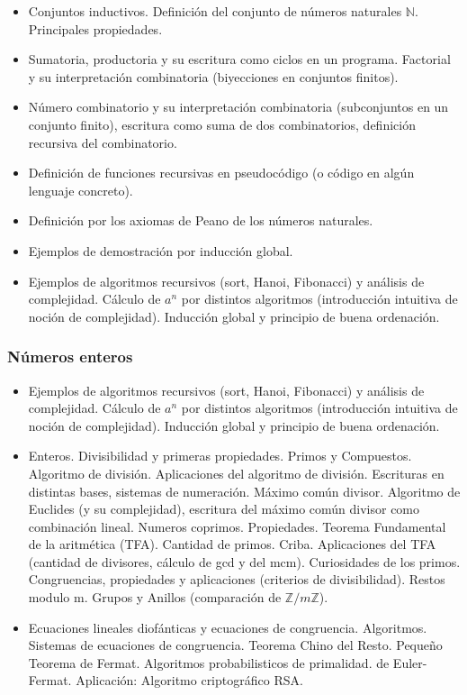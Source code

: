 \documentclass[a4paper,10pt,BCOR10mm,oneside,headsepline]{scrbook}
\begin{document}
\begin{itemize}
\item Conjuntos inductivos. Definición del conjunto de números naturales $\mathbb{N}$. Principales propiedades. 
\item Sumatoria, productoria y su escritura como ciclos en un programa. Factorial y su interpretación combinatoria (biyecciones en conjuntos finitos). 
\item Número combinatorio y su interpretación combinatoria (subconjuntos en un conjunto finito), escritura como suma de dos combinatorios, definición recursiva del combinatorio. 
\item  Definición de funciones recursivas en pseudocódigo (o código en algún lenguaje concreto). 
\item Definición por los axiomas de Peano de los números naturales. 
\item Ejemplos de demostración por inducción global. 
\item  Ejemplos de algoritmos recursivos (sort, Hanoi, Fibonacci) y análisis de complejidad. Cálculo de $a^n$ por distintos algoritmos (introducción intuitiva de noción de complejidad). Inducción global y principio de buena ordenación.
 \end{itemize}


\subsubsection{Números enteros}

 \begin{itemize}
 \item  Ejemplos de algoritmos recursivos (sort, Hanoi, Fibonacci) y análisis de complejidad. Cálculo de $a^n$ por distintos algoritmos (introducción intuitiva de noción de complejidad). Inducción global y principio de buena ordenación.

 \item Enteros. Divisibilidad y primeras propiedades. Primos y Compuestos.  Algoritmo de división. Aplicaciones del algoritmo de división. Escrituras en distintas bases, sistemas de numeración.  Máximo común divisor.  Algoritmo de Euclides (y su complejidad), escritura del máximo común divisor como combinación lineal. Numeros coprimos. Propiedades. Teorema Fundamental de la aritmética (TFA). Cantidad de primos. Criba. Aplicaciones del TFA (cantidad de divisores, cálculo de gcd y del mcm). Curiosidades de los primos. Congruencias,  propiedades y aplicaciones (criterios de divisibilidad). Restos modulo m. Grupos y Anillos (comparación de $\mathbb{Z}/m\mathbb{Z}$). 

 \item Ecuaciones lineales diofánticas y ecuaciones de congruencia. Algoritmos. Sistemas de ecuaciones de congruencia. Teorema Chino del Resto. Pequeño Teorema de Fermat. Algoritmos probabilisticos de primalidad. de Euler-Fermat. Aplicación: Algoritmo criptográfico RSA.
  \end{itemize}
\end{document}
